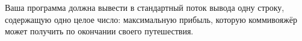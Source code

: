 Ваша программа должна вывести в стандартный поток вывода одну строку, содержащую одно целое число: максимальную прибыль, которую коммивояжёр может получить по окончании своего путешествия.